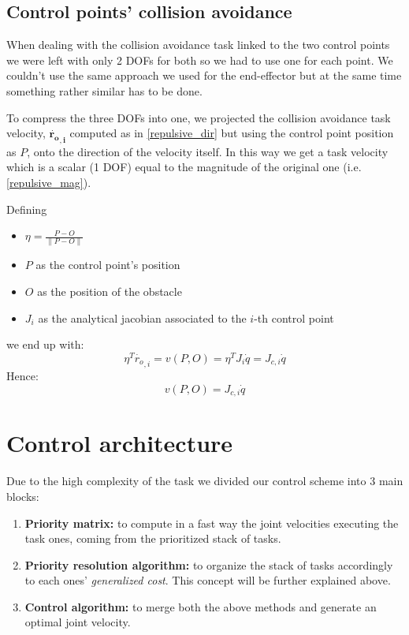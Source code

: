 \documentclass[11pt,a4paper, twocolumn, twoside]{article}
\begin{document}
\subsection[Tasks 3 \& 4]{Control points' collision avoidance}
When dealing with the collision avoidance task linked to the two control points we were left with only 2 DOFs for both so we had to use one for each point. We couldn't use the same approach we used for the end-effector but at the same time something rather similar has to be done. 

To compress the three DOFs into one, we projected the collision avoidance task velocity, $\mathbf{\dot{r_{o}}_{,i}}$ computed as in \eqref{repulsive_dir} but using the control point position as $P$, onto the direction of the velocity itself. In this way we get a task velocity which is a scalar (1 DOF) equal to the magnitude of the original one (i.e. \eqref{repulsive_mag}).

Defining 
\begin{itemize}
	\item $\eta = \frac{P - O}{\lVert P-O \rVert}$
	\item $P$ as the control point's position
	\item $O$ as the position of the obstacle
	\item $J_i$ as the analytical jacobian associated to the $i$-th control point
\end{itemize}
we end up with:
\begin{equation*}
\eta^T\dot{r_{o}}_{,i} = v(P,O) =\eta^T J_i\dot{q} = J_{c,i}\dot{q}
\end{equation*}
Hence:
\begin{equation}
v(P,O) = J_{c,i}\dot{q}
\end{equation}

\section{Control architecture}
Due to the high complexity of the task we divided our control scheme into 3 main blocks:
\begin{enumerate}
	\item \textbf{Priority matrix:} to compute in a fast way the joint velocities executing the task ones, coming from the prioritized stack of tasks.
	\item \textbf{Priority resolution algorithm:} to organize the stack of tasks accordingly to each ones' \textit{generalized cost}.
	This concept will be further explained above.
	\item \textbf{Control algorithm:} to merge both the above methods and generate an optimal joint velocity.
\end{enumerate}
\end{document}

